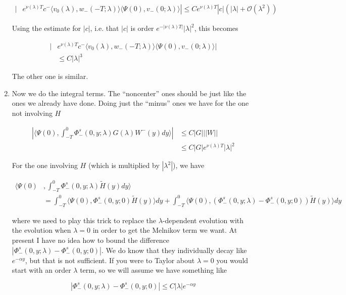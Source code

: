 \documentclass[12pt]{article}
\begin{document}
\begin{enumerate}
\begin{align*}
|&e^{\nu(\lambda)T} c^- \langle v_0(\lambda), w_-(-T; \lambda) \rangle \langle \Psi(0), v_-(0; \lambda) \rangle|
\leq C e^{\nu(\lambda)T}|c| (|\lambda| + \mathcal{O}(\lambda^2) )
\end{align*}

Using the estimate for $|c|$, i.e. that $|c|$ is order $e^{-|\nu(\lambda)T|} |\lambda|^2$, this becomes 

\begin{align*}
|&e^{\nu(\lambda)T} c^- \langle v_0(\lambda), w_-(-T; \lambda) \rangle \langle \Psi(0), v_-(0; \lambda) \rangle|\\
&\leq C |\lambda|^3
\end{align*}

The other one is similar.

\item Now we do the integral terms. The ``noncenter'' ones should be just like the ones we already have done. Doing just the ``minus'' ones we have for the one not involving $H$

\begin{align*}
\left| \langle \Psi(0), \int_{-T}^0 \Phi^s_-(0, y; \lambda) G(\lambda)W^-(y) dy \rangle \right|
&\leq C |G| ||W|| \\
&\leq C |G| e^{\nu(\lambda)T}|\lambda|^2 
\end{align*}

For the one involving $H$ (which is multiplied by $|\lambda^2|$), we have

\begin{align*}
\langle \Psi(0)&, \int_{-T}^0 \Phi^s_-(0, y; \lambda) \tilde{H}(y) dy \rangle \\ 
&= \int_{-T}^0 \langle \Psi(0), \Phi^s_-(0, y; 0) \tilde{H}(y) \rangle dy + 
\int_{-T}^0 \langle \Psi(0), (\Phi^s_-(0, y; \lambda) - \Phi^s_-(0, y; 0)) \tilde{H}(y) \rangle dy
\end{align*}

where we need to play this trick to replace the $\lambda$-dependent evolution with the evolution when $\lambda = 0$ in order to get the Melnikov term we want. At present I have no idea how to bound the difference $|\Phi^s_-(0, y; \lambda) - \Phi^s_-(0, y; 0)|$. We do know that they individually decay like $e^{-\alpha y}$, but that is not sufficient. If you were to Taylor about $\lambda = 0$ you would start with an order $\lambda$ term, so we will assume we have something like

\[
|\Phi^s_-(0, y; \lambda) - \Phi^s_-(0, y; 0)| \leq C |\lambda| e^{-\alpha y}
\]


\end{enumerate}
\end{document}
